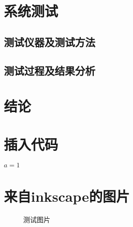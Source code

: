 \documentclass[pdfCover]{contestTemplate} %
\begin{document}
\section{系统测试}

	\subsection{测试仪器及测试方法}

	\subsection{测试过程及结果分析}

\section{结论}


\section*{插入代码}
\begin{codebox}
  \li $a = 1$

\end{codebox}

\section*{来自inkscape的图片}
	\begin{figure}[H]
		\centering
		\def\svgwidth{0.6\linewidth}
		
		\caption{测试图片}
		\label{fig:_test}
	\end{figure}



\nocite{*}
\end{document}
